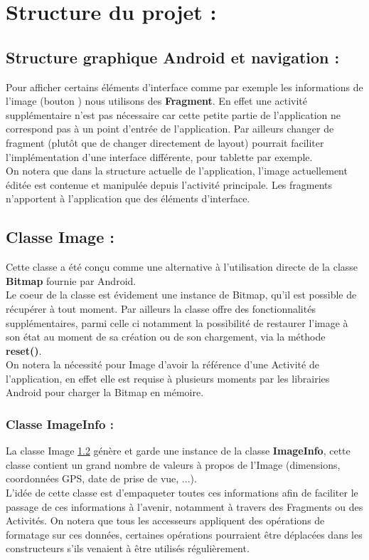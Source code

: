 \section{Structure du projet :}

\subsection{Structure graphique Android et navigation :}
Pour afficher certains éléments d'interface comme par exemple les informations de l'image (bouton \faInfoCircle) nous utilisons des \textbf{Fragment}. En effet une activité supplémentaire n'est pas nécessaire car cette petite partie de l'application ne correspond pas à un point d'entrée de l'application. Par ailleurs changer de fragment (plutôt que de changer directement de layout) pourrait faciliter l'implémentation d'une interface différente, pour tablette par exemple.
\\
On notera que dans la structure actuelle de l'application, l'image actuellement éditée est contenue et manipulée depuis l'activité principale. Les fragments n'apportent à l'application que des éléments d'interface.
\\

\subsection{Classe \textbf{Image} :} \label{classeImage}
Cette classe a été conçu comme une alternative à l'utilisation directe de la classe \textbf{Bitmap} fournie par Android.
\\
Le coeur de la classe est évidement une instance de Bitmap, qu'il est possible de récupérer à tout moment. Par ailleurs la classe offre des fonctionnalités supplémentaires, parmi celle ci notamment la possibilité de restaurer l'image à son état au moment de sa création ou de son chargement, via la méthode \textbf{reset()}.
\\
On notera la nécessité pour Image d'avoir la référence d'une Activité de l'application, en effet elle est requise à plusieurs moments par les librairies Android pour charger la Bitmap en mémoire.

\subsubsection{Classe \textbf{ImageInfo} :}
La classe Image \ref{classeImage} génère et garde une instance de la classe \textbf{ImageInfo}, cette classe contient un grand nombre de valeurs à propos de l'Image (dimensions, coordonnées GPS, date de prise de vue, ...).
\\
L'idée de cette classe est d'empaqueter toutes ces informations afin de faciliter le passage de ces informations à l'avenir, notamment à travers des Fragments ou des Activités. On notera que tous les accesseurs appliquent des opérations de formatage sur ces données, certaines opérations pourraient être déplacées dans les constructeurs s'ils venaient à être utilisés régulièrement. 


